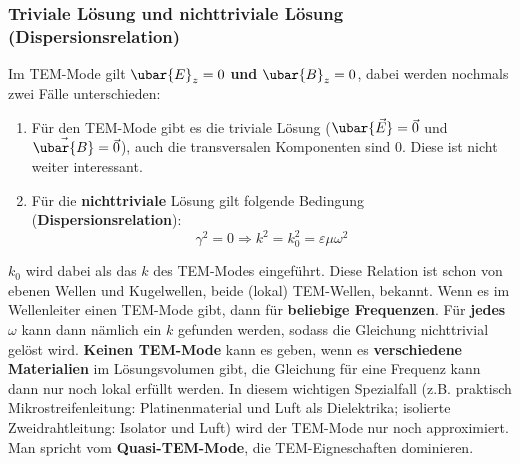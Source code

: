 \subsubsection{Triviale Lösung und nichttriviale Lösung (Dispersionsrelation)}
Im TEM-Mode gilt \(\ubar{E}_z=0\) \textbf{und} \(\ubar{B}_z=0\), dabei werden nochmals zwei Fälle unterschieden:
\begin{enumerate}
	\item Für den TEM-Mode gibt es die triviale Lösung (\(\ubar{\vec{E}}=\vec{0}\) und \(\vec{\ubar{B}}=\vec{0}\)), auch die transversalen Komponenten sind $0$. Diese ist nicht weiter interessant.
	\item Für die \textbf{nichttriviale} Lösung gilt folgende Bedingung (\textbf{Dispersionsrelation}):
	\begin{equation}\label{disp}
		\gamma^2=0 \Rightarrow \boxed{ k^2 =  k_0^2= \varepsilon\mu\omega^2}
	\end{equation}
\end{enumerate}
$k_0$ wird dabei als das $k$ des TEM-Modes eingeführt. Diese Relation ist schon von ebenen Wellen und Kugelwellen, beide (lokal) TEM-Wellen, bekannt. Wenn es im Wellenleiter einen TEM-Mode gibt, dann für \textbf{beliebige Frequenzen}. Für \textbf{jedes} $\omega$ kann dann nämlich ein $k$ gefunden werden, sodass die Gleichung nichttrivial gelöst wird. \textbf{Keinen TEM-Mode} kann es geben, wenn es \textbf{verschiedene Materialien} im Lösungsvolumen gibt, die Gleichung für eine Frequenz kann dann nur noch lokal erfüllt werden. In diesem wichtigen Spezialfall (z.B. praktisch Mikrostreifenleitung: Platinenmaterial und Luft als Dielektrika; isolierte Zweidrahtleitung: Isolator und Luft) wird der TEM-Mode nur noch approximiert. Man spricht vom \textbf{Quasi-TEM-Mode}, die TEM-Eigneschaften dominieren.
